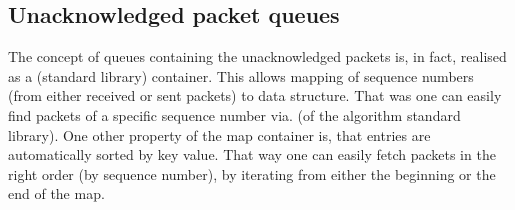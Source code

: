 \subsection{Unacknowledged packet queues}
The concept of queues containing the unacknowledged packets is, in fact, realised as a  (standard library) container. This allows mapping of sequence numbers (from either received or sent packets) to  data structure. That was one can easily find packets of a specific sequence number via.  (of the algorithm standard library). One other property of the map container is, that entries are automatically sorted by key value. That way one can easily fetch packets in the right order (by sequence number), by iterating from either the beginning or the end of the map.
